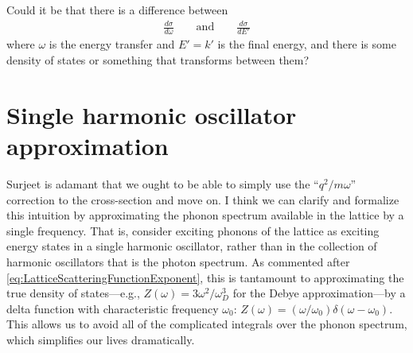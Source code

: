 \documentclass{article}
\begin{document}
Could it be that there is a difference between
\begin{align}
\frac{d \sigma}{d \omega} \qquad\text{and}\qquad \frac{d \sigma}{d E'}
\end{align}
where $\omega$ is the energy transfer and $E' = k'$ is the final energy, and there is some density of states or something that transforms between them?


\section{Single harmonic oscillator approximation}

Surjeet is adamant that we ought to be able to simply use the ``$q^2 / m \omega$'' correction to the cross-section and move on. I think we can clarify and formalize this intuition by approximating the phonon spectrum available in the lattice by a single frequency. That is, consider exciting phonons of the lattice as exciting energy states in a single harmonic oscillator, rather than in the collection of harmonic oscillators that is the photon spectrum. As commented after \eqref{eq:LatticeScatteringFunctionExponent}, this is tantamount to approximating the true density of states---e.g., $Z(\omega) = 3 \omega^2 / \omega_D^3$ for the Debye approximation---by a delta function with characteristic frequency $\omega_0$: $Z(\omega) = (\omega / \omega_0) \delta(\omega - \omega_0)$. This allows us to avoid all of the complicated integrals over the phonon spectrum, which simplifies our lives dramatically.
\end{document}
